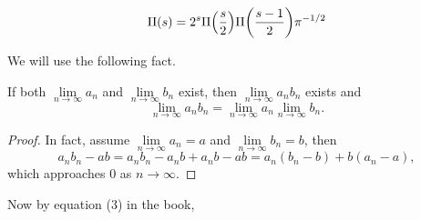 \documentclass{note}
\numberwithin{equation}{chapter}
\begin{document}
\begin{quotebar}
    \begin{equation*}
        \Pi(s) = 2^s \Pi \prn{\frac{s}{2}} \Pi \prn{\frac{s - 1}{2}} \pi^{-1/2}
    \end{equation*}
\end{quotebar}

We will use the following fact.
\begin{lemma*}
    If both $\lim\limits_{n\rightarrow\infty} a_n$ and $\lim\limits_{n\rightarrow\infty}
        b_n$ exist, then $\lim\limits_{n\rightarrow\infty} a_n b_n$ exists and
    \begin{equation*}
        \lim_{n\rightarrow\infty} a_n b_n = \lim_{n\rightarrow\infty} a_n
        \lim_{n\rightarrow\infty} b_n.
    \end{equation*}
\end{lemma*}
\begin{proof}
    In fact, assume $\lim\limits_{n\rightarrow\infty} a_n = a$ and
    $\lim\limits_{n\rightarrow\infty} b_n = b$, then
    \begin{equation*}
        a_n b_n - ab = a_n b_n - a_n b + a_n b - ab = a_n(b_n - b) + b(a_n - a),
    \end{equation*}
    which approaches $0$ as $n \rightarrow \infty$.
\end{proof}
Now by equation (3) in the book,
\end{document}
